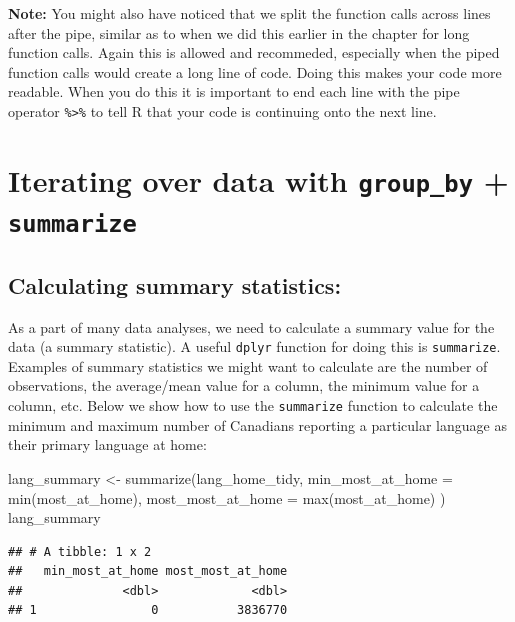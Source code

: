\documentclass[
]{krantz}
\makeatletter
\newenvironment{Shaded}{\begin{snugshade}}{\end{snugshade}}
\newcommand{\AttributeTok}[1]{\textcolor[rgb]{0.61,0.61,0.61}{#1}}
\newcommand{\FunctionTok}[1]{\textcolor[rgb]{0,0,0}{#1}}
\newcommand{\NormalTok}[1]{#1}
\newcommand{\OtherTok}[1]{\textcolor[rgb]{0.37,0.37,0.37}{#1}}
\renewenvironment{quote}{\begin{VF}}{\end{VF}}
\newenvironment{kframe}{%
\medskip{}
\setlength{\fboxsep}{.8em}
 \def\at@end@of@kframe{}%
 \ifinner\ifhmode%
  \def\at@end@of@kframe{\end{minipage}}%
  \begin{minipage}{\columnwidth}%
 \fi\fi%
 \def\FrameCommand##1{\hskip\@totalleftmargin \hskip-\fboxsep
 \colorbox{shadecolor}{##1}\hskip-\fboxsep
     \hskip-\linewidth \hskip-\@totalleftmargin \hskip\columnwidth}%
 \MakeFramed {\advance\hsize-\width
   \@totalleftmargin\z@ \linewidth\hsize
   \@setminipage}}%
 {\par\unskip\endMakeFramed%
 \at@end@of@kframe}
\renewenvironment{Shaded}{\begin{kframe}}{\end{kframe}}
\makeatother
\begin{document}
\begin{quote}
\textbf{Note:} You might also have noticed that we split the function calls across lines after the pipe, similar as to
when we did this earlier in the chapter for long function calls. Again this is allowed and recommeded, especially when the
piped function calls would create a long line of code. Doing this makes your code more readable. When you do this it is important
to end each line with the pipe operator \texttt{\%\textgreater{}\%} to tell R that your code is continuing onto the next line.
\end{quote}

\hypertarget{iterating-over-data-with-group_by-summarize}{%
\section{\texorpdfstring{Iterating over data with \texttt{group\_by} + \texttt{summarize}}{Iterating over data with group\_by + summarize}}\label{iterating-over-data-with-group_by-summarize}}

\hypertarget{calculating-summary-statistics}{%
\subsection{Calculating summary statistics:}\label{calculating-summary-statistics}}

As a part of many data analyses, we need to calculate a summary value for the data (a summary statistic). A useful \texttt{dplyr} function for doing this is
\texttt{summarize}. Examples of summary statistics we might want to calculate are the number of observations, the average/mean value
for a column, the minimum value for a column, etc. Below we show how to use the \texttt{summarize} function to calculate the minimum and maximum
number of Canadians reporting a particular language as their primary language at home:

\begin{Shaded}
\begin{Highlighting}[]
\NormalTok{lang\_summary }\OtherTok{\textless{}{-}} \FunctionTok{summarize}\NormalTok{(lang\_home\_tidy,}
  \AttributeTok{min\_most\_at\_home =} \FunctionTok{min}\NormalTok{(most\_at\_home),}
  \AttributeTok{most\_most\_at\_home =} \FunctionTok{max}\NormalTok{(most\_at\_home)}
\NormalTok{)}
\NormalTok{lang\_summary}
\end{Highlighting}
\end{Shaded}

\begin{verbatim}
## # A tibble: 1 x 2
##   min_most_at_home most_most_at_home
##              <dbl>             <dbl>
## 1                0           3836770
\end{verbatim}
\end{document}
